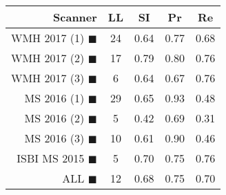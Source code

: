 \begin{tabular}{rcccc}
\toprule
Scanner & LL & SI & Pr & Re \\
\midrule
WMH 2017 (1) {\color[rgb]{ 1.00 0.00 0.00}$\blacksquare$} & 24 & 0.64 & 0.77 & 0.68 \\
WMH 2017 (2) {\color[rgb]{ 1.00 0.50 0.00}$\blacksquare$} & 17 & 0.79 & 0.80 & 0.76 \\
WMH 2017 (3) {\color[rgb]{ 1.00 0.80 0.00}$\blacksquare$} & 6 & 0.64 & 0.67 & 0.76 \\
MS  2016 (1) {\color[rgb]{ 0.20 0.80 0.00}$\blacksquare$} & 29 & 0.65 & 0.93 & 0.48 \\
MS  2016 (2) {\color[rgb]{ 0.00 0.40 1.00}$\blacksquare$} & 5 & 0.42 & 0.69 & 0.31 \\
MS  2016 (3) {\color[rgb]{ 0.60 0.00 1.00}$\blacksquare$} & 10 & 0.61 & 0.90 & 0.46 \\
ISBI MS 2015 {\color[rgb]{ 1.00 0.00 1.00}$\blacksquare$} & 5 & 0.70 & 0.75 & 0.76 \\
\midrule
ALL {\color[rgb]{ 1.00 1.00 1.00}$\blacksquare$} & 12 & 0.68 & 0.75 & 0.70 \\
\bottomrule
\end{tabular}